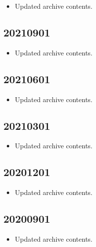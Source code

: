 \documentclass[hidelinks,a4paper,12pt]{article}
\begin{document}
\begin{itemize}
\item Updated archive contents.
\end{itemize}

\subsection{20210901}  \label{sec:changelog_20210901}

\begin{itemize}
\item Updated archive contents.
\end{itemize}

\subsection{20210601}  \label{sec:changelog_20210601}

\begin{itemize}
\item Updated archive contents.
\end{itemize}

\subsection{20210301}  \label{sec:changelog_20210301}

\begin{itemize}
\item Updated archive contents.
\end{itemize}

\subsection{20201201}  \label{sec:changelog_20201201}

\begin{itemize}
\item Updated archive contents.
\end{itemize}

\subsection{20200901}  \label{sec:changelog_20200901}

\begin{itemize}
\item Updated archive contents.
\end{itemize}
\end{document}
